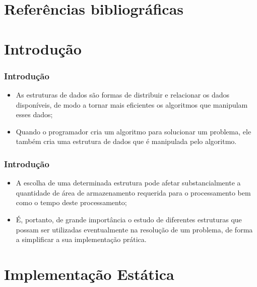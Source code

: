 \documentclass[aspectratio=169]{beamer}
\begin{document}

\section{Referências bibliográficas}
  
\section{Introdução} %

\begin{frame}
\frametitle{Introdução}
\begin{itemize}
 \item As estruturas de dados são formas de distribuir e relacionar os dados disponíveis, de modo a tornar mais eficientes os algoritmos que manipulam esses dados;
 \item Quando o programador cria um algoritmo para solucionar um problema, ele também cria uma estrutura de dados que é manipulada pelo algoritmo.
\end{itemize}
\end{frame}


\begin{frame}
\frametitle{Introdução}

\begin{itemize}
 \item A escolha de uma determinada estrutura pode afetar substancialmente a quantidade de área de armazenamento requerida para o processamento bem como o tempo deste processamento;
 \item É, portanto, de grande importância o estudo de diferentes estruturas que possam ser utilizadas eventualmente na resolução de um problema, de forma a simplificar a sua implementação prática.
\end{itemize}
\end{frame}

\section{Implementação Estática}
\end{document}
